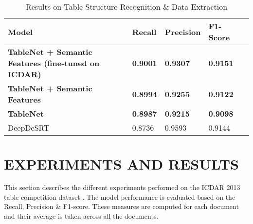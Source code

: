 \documentclass[conference]{IEEEtran}
\begin{document}
\begin{table}
\centering
\begin{tabular}{|M{3.7cm}||M{1cm}|M{1cm}|M{1.3cm}|M{1.3cm}|  }
\hline
Model & Recall & Precision & F1-Score\\
\hline
\textbf{TableNet + Semantic Features (fine-tuned on ICDAR)} & \textbf{0.9001} & \textbf{0.9307} & \textbf{0.9151}\\
\hline
\textbf{TableNet + Semantic Features} & \textbf{0.8994} & \textbf{0.9255} & \textbf{0.9122}\\
\hline
\textbf{TableNet} & \textbf{0.8987} & \textbf{0.9215} & \textbf{0.9098}\\
\hline
DeepDeSRT \cite{schreiber} & 0.8736 & 0.9593 & 0.9144\\
\hline
\end{tabular}
\caption{Results on Table Structure Recognition \& Data Extraction} \label{tab:sometab2}
\end{table}




















\section{EXPERIMENTS AND RESULTS}
\label{sec:results}
This section describes the different experiments performed on the ICDAR 2013 table competition dataset \cite{gobel2013icdar}. The model performance is evaluated based on the Recall, Precision \& F1-score. These measures are computed for each document and their average is taken across all the documents.
\end{document}

